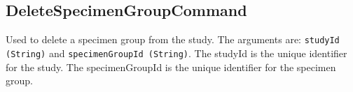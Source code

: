 \subsection*{DeleteSpecimenGroupCommand}

Used to delete a specimen group from the study. The arguments are:
\texttt{studyId (String)} and \texttt{specimenGroupId (String)}. The studyId is
the unique identifier for the study. The specimenGroupId is the unique
identifier for the specimen group.

